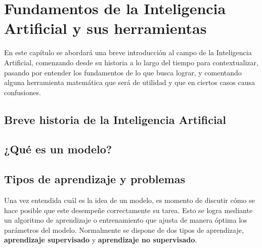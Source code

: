 \chapter{Fundamentos de la Inteligencia Artificial y sus herramientas}

	En este capítulo se abordará una breve introducción al campo de la Inteligencia Artificial, comenzando desde su historia a lo largo del tiempo para contextualizar, pasando por entender los fundamentos de lo que busca lograr, y comentando alguna herramienta matemática que será de utilidad y que en ciertos casos causa confusiones. 

	\section{Breve historia de la Inteligencia Artificial}
	
	\section{¿Qué es un modelo?}

	\section{Tipos de aprendizaje y problemas}
	
		Una vez entendida cuál es la idea de un modelo, es momento de discutir cómo se hace posible que este desempeñe correctamente su tarea. Esto se logra mediante un algoritmo de aprendizaje o entrenamiento que ajusta de manera óptima los parámetros del modelo. Normalmente se dispone de dos tipos de aprendizaje, \textbf{aprendizaje supervisado} y \textbf{aprendizaje no supervisado}\cite{Szeliski}. \\
		
